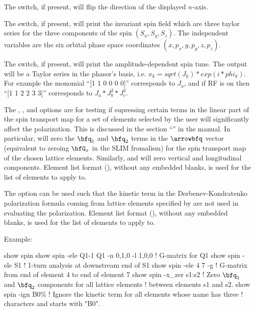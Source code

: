 {{{{{{{{{The  switch, if present, will flip the direction of the displayed $n$-axis. 

The  switch, if present, will print the invariant spin field which are three taylor series
for the three components of the spin $(S_x, S_y, S_z)$. The independent variables are the six orbital
phase space coordinates $(x, p_x, y, p_y, z, p_z)$.

The  switch, if present, will print the amplitude-dependent spin tune. The output will 
be a Taylor series in the phasor's basis, i.e. $x_k = sqrt(J_k)*exp(i*phi_k)$. For example the 
monomial ``[1 1 0 0 0 0]'' corresponds to $J_a$, and if RF is on then ``[1 1 2 2 3 3]'' corresponds 
to $J_a*J_b^2*J_c^3$.

The , , and  options are for testing if supressing certain terms
in the linear part of the spin transport map for a set of elements selected by the user will
significantly affect the polarization. This is discussed in the section ``'' in the \bmad manual. In particular,  will zero the $\bfq_1$ and $\bfq_2$
terms in the $\arrowbfq$ vector (equivalent to zeroing $\bfG_x$ in the SLIM fromalism) for the spin
transport map of the chosen lattice elements. Similarly,  and  will zero
vertical and longitudinal components. Element list format (), without any
embedded blanks, is used for the  list of elements to apply to.

The  option can be used such that the kinetic term in the Derbenev-Kondratenko
polarization formula coming from lattice elements specified by  are not used in
evaluating the polarization. Element list format (), without any embedded
blanks, is used for the  list of elements to apply to.


Example:
\begin{example}
  show spin
  show spin -ele Q1-1 Q1 -n 0,1,0 -l 1,0,0  ! G-matrix for Q1
  show spin -ele S1      ! 1-turn analysis at downstream end of S1 
  show spin -ele 4 7 -g  ! G-matrix from end of element 4 to end of element 7
  show spin -x_zer s1:s2 ! Zero \(\bfq_1\) and \(\bfq_2\) components for all lattice elements
                         ! between elements s1 and s2.
  show spin -ign B0\%    ! Ignore the kinetic term for all elements whose name has three 
                         !   characters and starts with "B0".
\end{example}

}}}}}}}}}
